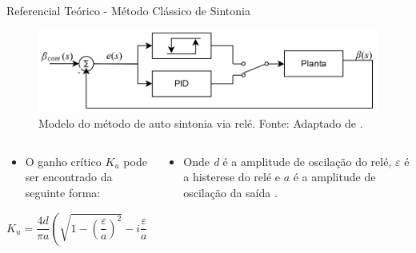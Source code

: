 \documentclass{beamer}
\begin{document}
\begin{frame}{Referencial Teórico - Método Clássico de Sintonia}
    \begin{figure}[HT]
		\begin{center}
		\captionsetup{justification=centering}
        \includegraphics[scale=.3]{../referencial/img/pid_autotuning_relay_astrom_p239}
        \caption{Modelo do método de auto sintonia via relé. \newline
        		 Fonte: Adaptado de .}
		\label{FIG_ADAPTATIVO}
        \end{center}
	\end{figure}
\begin{columns}
    \begin{column}{0.50\textwidth}
	\begin{itemize}
		\item O ganho crítico $K_u$ pode ser encontrado da seguinte forma:
	\end{itemize}
	\begin{equation}\label{eq:n(a)}
	  K_u=\frac{4d}{\pi a}\left(\sqrt{1-\left(\frac{\varepsilon}{a}\right)^{2}}-i\frac{\varepsilon}{a}\right) 
	\end{equation}
    \end{column}
    \begin{column}{0.5\textwidth}

	\begin{itemize}
	\item Onde \textit{d} é a amplitude de oscilação do relé, \textit{$\varepsilon$} é a histerese do relé e \textit{$a$} é a amplitude de oscilação da saída \cite{Levine1996}.
	\end{itemize}
	\end{column}
\end{columns}
\end{frame}

\end{document}
